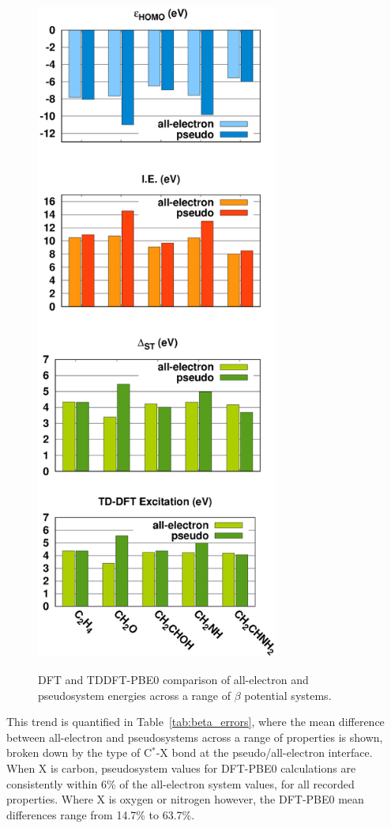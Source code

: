 \documentclass[aip,reprint,nofootinbib]{revtex4-1}
\begin{document}
\begin{figure}
\caption[Energy level results for $\beta$ pseudopotentials.]{DFT and TDDFT-PBE0 comparison of all-electron and pseudosystem energies across a range of $\beta$ potential systems.}
\begin{center}
\includegraphics[width=8cm]{beta_pbe0}
\label{fig:beta_graphs}
\end{center}
\end{figure}

This trend is quantified in Table~\ref{tab:beta_errors}, where the mean difference between all-electron and pseudosystems across a range of properties is shown, broken down by the type of C$^\ast$-X bond at the pseudo/all-electron interface. When X is carbon, pseudosystem values for DFT-PBE0 calculations are consistently within 6\% of the all-electron system values, for all recorded properties. Where X is oxygen or nitrogen however, the DFT-PBE0 mean differences range from 14.7\% to 63.7\%.
\end{document}
